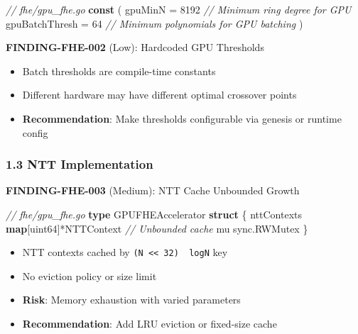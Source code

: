 \documentclass[
]{article}
\newenvironment{Shaded}{}{}
\newcommand{\CommentTok}[1]{\textcolor[rgb]{0.38,0.63,0.69}{\textit{#1}}}
\newcommand{\DataTypeTok}[1]{\textcolor[rgb]{0.56,0.13,0.00}{#1}}
\newcommand{\DecValTok}[1]{\textcolor[rgb]{0.25,0.63,0.44}{#1}}
\newcommand{\KeywordTok}[1]{\textcolor[rgb]{0.00,0.44,0.13}{\textbf{#1}}}
\newcommand{\NormalTok}[1]{#1}
\newcommand{\OperatorTok}[1]{\textcolor[rgb]{0.40,0.40,0.40}{#1}}
\providecommand{\tightlist}{%
  \setlength{\itemsep}{0pt}\setlength{\parskip}{0pt}}
\begin{document}
\begin{Shaded}
\begin{Highlighting}[]
\CommentTok{// fhe/gpu\_fhe.go}
\KeywordTok{const} \OperatorTok{(}
\NormalTok{    gpuMinN        }\OperatorTok{=} \DecValTok{8192}   \CommentTok{// Minimum ring degree for GPU}
\NormalTok{    gpuBatchThresh }\OperatorTok{=} \DecValTok{64}     \CommentTok{// Minimum polynomials for GPU batching}
\OperatorTok{)}
\end{Highlighting}
\end{Shaded}

\textbf{FINDING-FHE-002} (Low): Hardcoded GPU Thresholds

\begin{itemize}
\tightlist
\item
  Batch thresholds are compile-time constants
\item
  Different hardware may have different optimal crossover points
\item
  \textbf{Recommendation}: Make thresholds configurable via genesis or
  runtime config
\end{itemize}

\subsubsection{1.3 NTT Implementation}\label{13-ntt-implementation}

\textbf{FINDING-FHE-003} (Medium): NTT Cache Unbounded Growth

\begin{Shaded}
\begin{Highlighting}[]
\CommentTok{// fhe/gpu\_fhe.go}
\KeywordTok{type}\NormalTok{ GPUFHEAccelerator }\KeywordTok{struct} \OperatorTok{\{}
\NormalTok{    nttContexts }\KeywordTok{map}\OperatorTok{[}\DataTypeTok{uint64}\OperatorTok{]*}\NormalTok{NTTContext  }\CommentTok{// Unbounded cache}
\NormalTok{    mu          sync}\OperatorTok{.}\NormalTok{RWMutex}
\OperatorTok{\}}
\end{Highlighting}
\end{Shaded}

\begin{itemize}
\tightlist
\item
  NTT contexts cached by
  \texttt{(N\ \textless{}\textless{}\ 32)\ \textbar{}\ logN} key
\item
  No eviction policy or size limit
\item
  \textbf{Risk}: Memory exhaustion with varied parameters
\item
  \textbf{Recommendation}: Add LRU eviction or fixed-size cache
\end{itemize}
\end{document}
